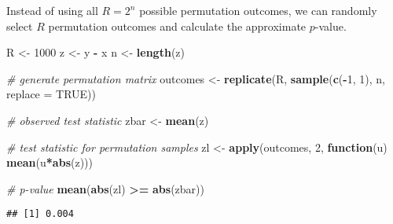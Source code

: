 \documentclass[
]{book}
\newenvironment{Shaded}{\begin{snugshade}}{\end{snugshade}}
\newcommand{\CommentTok}[1]{\textcolor[rgb]{0.56,0.35,0.01}{\textit{#1}}}
\newcommand{\ControlFlowTok}[1]{\textcolor[rgb]{0.13,0.29,0.53}{\textbf{#1}}}
\newcommand{\DataTypeTok}[1]{\textcolor[rgb]{0.13,0.29,0.53}{#1}}
\newcommand{\DecValTok}[1]{\textcolor[rgb]{0.00,0.00,0.81}{#1}}
\newcommand{\KeywordTok}[1]{\textcolor[rgb]{0.13,0.29,0.53}{\textbf{#1}}}
\newcommand{\NormalTok}[1]{#1}
\newcommand{\OperatorTok}[1]{\textcolor[rgb]{0.81,0.36,0.00}{\textbf{#1}}}
\newcommand{\OtherTok}[1]{\textcolor[rgb]{0.56,0.35,0.01}{#1}}
\newcommand{\StringTok}[1]{\textcolor[rgb]{0.31,0.60,0.02}{#1}}
\begin{document}
Instead of using all \(R = 2^n\) possible permutation outcomes,
we can randomly select \(R\) permutation outcomes and calculate the approximate \(p\)-value.

\begin{Shaded}
\begin{Highlighting}[]
\NormalTok{R <-}\StringTok{ }\DecValTok{1000}
\NormalTok{z <-}\StringTok{ }\NormalTok{y }\OperatorTok{-}\StringTok{ }\NormalTok{x}
\NormalTok{n <-}\StringTok{ }\KeywordTok{length}\NormalTok{(z)}

\CommentTok{# generate permutation matrix}
\NormalTok{outcomes <-}\StringTok{ }\KeywordTok{replicate}\NormalTok{(R, }\KeywordTok{sample}\NormalTok{(}\KeywordTok{c}\NormalTok{(}\OperatorTok{-}\DecValTok{1}\NormalTok{, }\DecValTok{1}\NormalTok{), n, }\DataTypeTok{replace =} \OtherTok{TRUE}\NormalTok{))}

\CommentTok{# observed test statistic}
\NormalTok{zbar <-}\StringTok{ }\KeywordTok{mean}\NormalTok{(z)}

\CommentTok{# test statistic for permutation samples}
\NormalTok{zl <-}\StringTok{ }\KeywordTok{apply}\NormalTok{(outcomes, }\DecValTok{2}\NormalTok{, }\ControlFlowTok{function}\NormalTok{(u) }\KeywordTok{mean}\NormalTok{(u}\OperatorTok{*}\KeywordTok{abs}\NormalTok{(z)))}

\CommentTok{# p-value}
\KeywordTok{mean}\NormalTok{(}\KeywordTok{abs}\NormalTok{(zl) }\OperatorTok{>=}\StringTok{ }\KeywordTok{abs}\NormalTok{(zbar))}
\end{Highlighting}
\end{Shaded}

\begin{verbatim}
## [1] 0.004
\end{verbatim}

  
\end{document}

